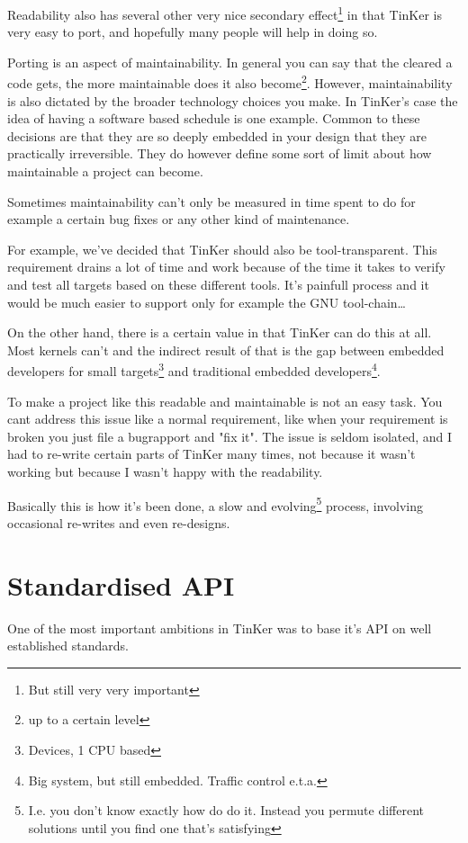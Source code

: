 Readability also has several other very nice secondary effect\footnote{But still very very important} in that TinKer is very easy to port, and hopefully many people will help in doing so.

Porting is an aspect of maintainability. In general you can say that the cleared a code gets, the more maintainable does it also become\footnote{up to a certain level}. However, maintainability is also dictated by the broader technology choices you make. In TinKer's case the idea of having a software based schedule is one example. Common to these decisions are that they are so deeply embedded in your design that they are practically irreversible. They do however define some sort of limit about how maintainable a project can become.

Sometimes maintainability can't only be measured in time spent to do for example a certain bug fixes or any other kind of maintenance.

For example, we've decided that TinKer should also be tool-transparent. This requirement drains a lot of time and work because of the time it takes to verify and test all targets based on these different tools. It's painfull process and it would be much easier to support only for example the GNU tool-chain\ldots

On the other hand, there is a certain value in that TinKer can do this at all. Most kernels can't and the indirect result of that is the gap between embedded developers for small targets\footnote{Devices, 1 CPU based} and traditional embedded developers\footnote{Big system, but still embedded. Traffic control e.t.a.}.

To make a project like this readable and maintainable is not an easy task. You cant address this issue like a normal requirement, like when your requirement is broken you just file a bugrapport and "fix it". The issue is seldom isolated, and I had to re-write certain parts of TinKer many times, not because it wasn't working but because I wasn't happy with the readability.

Basically this is how it's been done, a slow and evolving\footnote{I.e. you don't know exactly how do do it. Instead you permute different solutions until you find one that's satisfying} process, involving occasional re-writes and even re-designs.

\chapter{Standardised API}
One of the most important ambitions in TinKer was to base it's API on well established standards.

